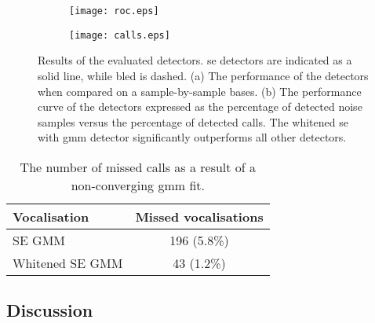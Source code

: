 {%

\begin{figure}[h]
     \centering
     \begin{subfigure}[t]{0.45\textwidth}
    \centering
    \texttt{[image: roc.eps]}    
     \caption{} \label{fig:det_roc}
     \end{subfigure}
     \begin{subfigure}[t]{0.45\textwidth}
    \centering
    \texttt{[image: calls.eps]}    
    \caption{} \label{fig:det_calls}
     \end{subfigure}
     \caption{Results of the evaluated detectors. \ac{se} detectors are indicated as a solid line, while \ac{bled} is dashed. (a) The performance of the detectors when compared on a sample-by-sample bases. (b) The performance curve of the detectors expressed as the percentage of detected noise samples versus the percentage of detected calls. The whitened \ac{se} with \ac{gmm} detector significantly outperforms all other detectors.}
\end{figure}


\begin{table}[h] 
    \centering
\caption{The number of missed calls as a result of a non-converging \ac{gmm} fit.}
\label{tab:convergence}
\begin{tabular}{lc} 
\hline
\textbf{Vocalisation}       & \textbf{Missed vocalisations}  \\ \hline
SE GMM                      & 196 (5.8\%)                      \\
Whitened SE GMM             & 43 (1.2\%)                    \\ \hline
\end{tabular}
\end{table}





\subsection{Discussion}

}
